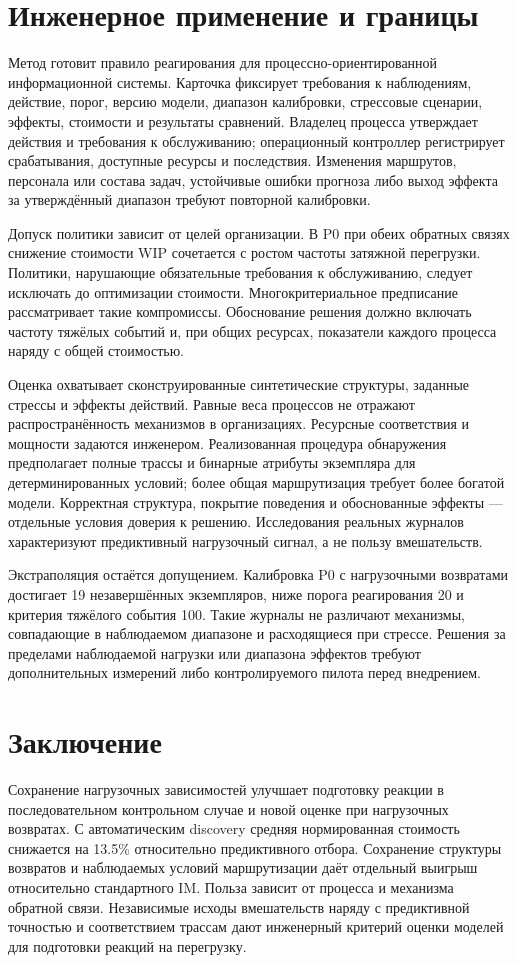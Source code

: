 \section{Инженерное применение и границы}
Метод готовит правило реагирования для процессно-ориентированной информационной системы. Карточка фиксирует требования к наблюдениям, действие, порог, версию модели, диапазон калибровки, стрессовые сценарии, эффекты, стоимости и результаты сравнений. Владелец процесса утверждает действия и требования к обслуживанию; операционный контроллер регистрирует срабатывания, доступные ресурсы и последствия. Изменения маршрутов, персонала или состава задач, устойчивые ошибки прогноза либо выход эффекта за утверждённый диапазон требуют повторной калибровки. 

Допуск политики зависит от целей организации. В P0 при обеих обратных связях снижение стоимости WIP сочетается с ростом частоты затяжной перегрузки. Политики, нарушающие обязательные требования к обслуживанию, следует исключать до оптимизации стоимости. Многокритериальное предписание~\cite{multikpi} рассматривает такие компромиссы. Обоснование решения должно включать частоту тяжёлых событий и, при общих ресурсах, показатели каждого процесса наряду с общей стоимостью.

Оценка охватывает сконструированные синтетические структуры, заданные стрессы и эффекты действий. Равные веса процессов не отражают распространённость механизмов в организациях. Ресурсные соответствия и мощности задаются инженером. Реализованная процедура обнаружения предполагает полные трассы и бинарные атрибуты экземпляра для детерминированных условий; более общая маршрутизация требует более богатой модели. Корректная структура, покрытие поведения и обоснованные эффекты — отдельные условия доверия к решению. Исследования реальных журналов характеризуют предиктивный нагрузочный сигнал, а не пользу вмешательств.

Экстраполяция остаётся допущением. Калибровка P0 с нагрузочными возвратами достигает 19 незавершённых экземпляров, ниже порога реагирования 20 и критерия тяжёлого события 100. Такие журналы не различают механизмы, совпадающие в наблюдаемом диапазоне и расходящиеся при стрессе. Решения за пределами наблюдаемой нагрузки или диапазона эффектов требуют дополнительных измерений либо контролируемого пилота перед внедрением.

\section{Заключение}
Сохранение нагрузочных зависимостей улучшает подготовку реакции в последовательном контрольном случае и новой оценке при нагрузочных возвратах. С автоматическим discovery средняя нормированная стоимость снижается на 13.5\% относительно предиктивного отбора. Сохранение структуры возвратов и наблюдаемых условий маршрутизации даёт отдельный выигрыш относительно стандартного IM. Польза зависит от процесса и механизма обратной связи. Независимые исходы вмешательств наряду с предиктивной точностью и соответствием трассам дают инженерный критерий оценки моделей для подготовки реакций на перегрузку.

